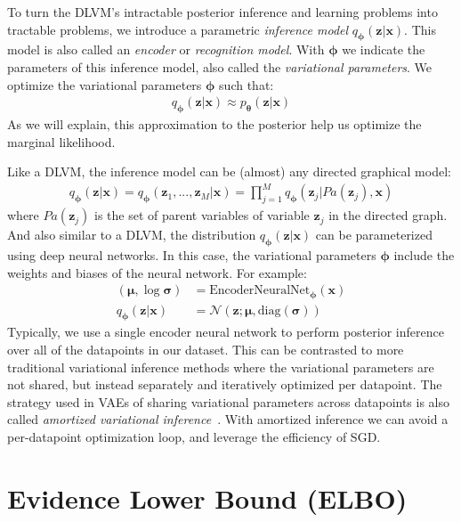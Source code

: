 \documentclass[MAL,biber]{nowfnt} %
\newcommand{\bb}[1]{\mathbf{#1}}
\newcommand{\bx}{\bb{x}}
\newcommand{\bz}{\bb{z}}
\newcommand{\bT}{\boldsymbol{\theta}}
\newcommand{\bphi}{\boldsymbol{\phi}}
\newcommand{\bsigma}{\boldsymbol{\sigma}}
\newcommand{\bmu}{\boldsymbol{\mu}}
\newcommand{\pT}{p_{\bT}}
\newcommand{\qP}{q_{\bphi}}
\newcommand{\EncoderNeuralNet}{\text{EncoderNeuralNet}_{\bphi}}
\begin{document}
To turn the DLVM's intractable posterior inference and learning problems into tractable problems, we introduce a parametric \emph{inference model} $\qP(\bz|\bx)$. This model is also called an \emph{encoder} or \emph{recognition model}. With $\bphi$ we indicate the parameters of this inference model, also called the \emph{variational parameters}. We optimize the variational parameters $\bphi$ such that:
\begin{align}
\qP(\bz|\bx) \approx \pT(\bz|\bx)
\end{align}
As we will explain, this approximation to the posterior help us optimize the marginal likelihood.

Like a DLVM, the inference model can be (almost) any directed graphical model:
\begin{align}
\qP(\bz|\bx) = \qP(\bz_1,...,\bz_M | \bx) = \prod_{j=1}^M \qP(\bz_j | Pa(\bz_j), \bx) 
\end{align}
where $Pa(\bz_j)$ is the set of parent variables of variable $\bz_j$ in the directed graph. And also similar to a DLVM, the distribution $\qP(\bz|\bx)$ can be parameterized using deep neural networks. In this case, the variational parameters $\bphi$ include the weights and biases of the neural network. For example:
\begin{align}
(\bmu, \log \bsigma) &= \EncoderNeuralNet(\bx)\\
\qP(\bz|\bx) &= \mathcal{N}(\bz ; \bmu, \text{diag}(\bsigma))
\end{align}
Typically, we use a single encoder neural network to perform posterior inference over all of the datapoints in our dataset. This can be contrasted to more traditional variational inference methods where the variational parameters are not shared, but instead separately and iteratively optimized per datapoint. The strategy used in VAEs of sharing variational parameters across datapoints is also called \emph{amortized variational inference}~\citep{gershman2014amortized}. With amortized inference we can avoid a per-datapoint optimization loop, and leverage the efficiency of SGD.

\section{Evidence Lower Bound (ELBO)}
\label{sec:elbo}
\end{document}
